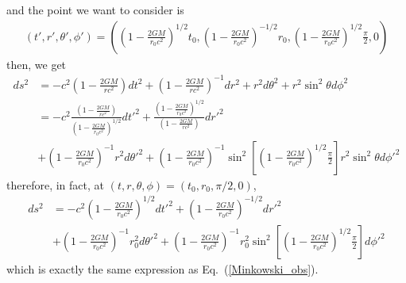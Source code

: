 \documentclass[12pt]{article}
\begin{document}
and the point we want to consider is
\begin{align*}
\left(t', r', \theta', \phi'\right) = \left(\left(1 - \frac{2 G M}{r_0 c^2} \right)^{1/2} t_0, \left(1 - \frac{2 G M}{r_0 c^2} \right)^{- 1/2} r_0, \left(1 - \frac{2 G M}{r_0 c^2} \right)^{1/2} \frac{\pi}{2}, 0\right)
\end{align*}
then, we get 
\begin{align*}
ds^2 &= -c^2 \left(1 - \frac{2 G M}{r c^2} \right) dt^2 + \left(1 - \frac{2 G M}{r c^2} \right)^{-1} dr^2 + r^2 d\theta^2 + r^2 \sin^2{\theta} d\phi^2\\[1em]
&= -c^2 \frac{\left(1 - \frac{2 G M}{r c^2} \right)}{\left(1 - \frac{2 G M}{r_0 c^2} \right)^{1/2}} dt'^2 + \frac{\left(1 - \frac{2 G M}{r_0 c^2} \right)^{1/2}}{\left(1 - \frac{2 G M}{r c^2} \right)}  dr'^2\\[1em]
&+ \left(1 - \frac{2 G M}{r_0 c^2} \right)^{-1} r^2 d\theta'^2 + \left(1 - \frac{2 G M}{r_0 c^2} \right)^{-1} \sin^2\left[\left(1 - \frac{2 G M}{r_0 c^2} \right)^{1/2} \frac{\pi}{2} \right] r^2 \sin^2{\theta} d\phi'^2
\end{align*}
therefore, in fact, at $\left(t, r, \theta, \phi\right) = \left(t_0, r_0, \pi/2, 0\right)$,
\begin{align*}
ds^2 &= -c^2 \left(1 - \frac{2 G M}{r_0 c^2} \right)^{1/2} dt'^2 + \left(1 - \frac{2 G M}{r_0 c^2} \right)^{-1/2} dr'^2\\[1em]
&+ \left(1 - \frac{2 G M}{r_0 c^2} \right)^{-1} r_0^2 d\theta'^2 + \left(1 - \frac{2 G M}{r_0 c^2} \right)^{-1} r_0^2 \sin^2\left[\left(1 - \frac{2 G M}{r_0 c^2} \right)^{1/2} \frac{\pi}{2} \right] d\phi'^2
\end{align*}
which is exactly the same expression as Eq.~(\ref{Minkowski_obs}).\\
\end{document}
